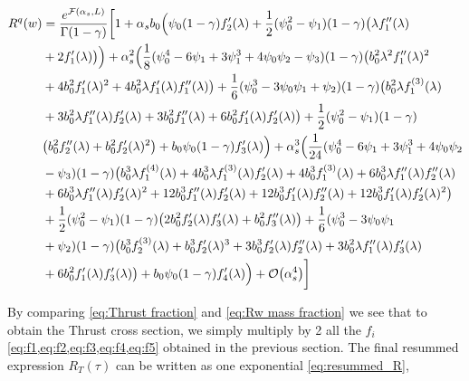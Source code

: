 \documentclass[../main.tex]{subfiles}
\begin{document}
\begin{align}
    \begin{split}\label{eq:Rw final expansion}
        R^q(w) &= \frac{e^{\mathcal{F}(\alpha_s,L)}}{\Gamma(1-\gamma)} \biggl[ 1 + \alpha_s b_0 \Bigl( \psi_0(1-\gamma) f_2'(\lambda )  + \frac{1}{2} (\psi_0^2-\psi_1)(1-\gamma)\bigl( \lambda  f_1''(\lambda ) \\
        &+2  f_1'(\lambda )\bigr)\Bigr) + \alpha_s^2 \Bigl(\frac{1}{8} (\psi_0^4 -6 \psi_1 + 3\psi_1^3 +4\psi_0\psi_2 -\psi_3)(1-\gamma) \bigl(b_0^2 \lambda ^2 f_1''(\lambda )^2\\
        &+4 b_0^2 f_1'(\lambda )^2 +4 b_0^2 \lambda  f_1'(\lambda ) f_1''(\lambda )\bigr)+\frac{1}{6} (\psi_0^3 -3 \psi_0\psi_1+\psi_2)(1-\gamma) \bigl(b_0^2 \lambda  f_1^{(3)}(\lambda )\\
        &+ 3 b_0^2 \lambda  f_1''(\lambda ) f_2'(\lambda )+3 b_0^2 f_1''(\lambda )+6 b_0^2 f_1'(\lambda ) f_2'(\lambda )\bigr)+\frac{1}{2} (\psi_0^2-\psi_1)(1-\gamma) \\
        &\bigl(b_0^2 f_2''(\lambda ) +b_0^2 f_2'(\lambda )^2\bigr) + b_0 \psi_0(1-\gamma) f_3'(\lambda )\Bigr) + \alpha_s^3 \Bigl(\frac{1}{24} (\psi_0^4 -6 \psi_1 + 3\psi_1^3 +4\psi_0\psi_2 \\
        &-\psi_3)(1-\gamma) \bigl(b_0^3 \lambda  f_1^{(4)}(\lambda ) +4 b_0^3 \lambda  f_1^{(3)}(\lambda ) f_2'(\lambda ) + 4 b_0^3 f_1^{(3)}(\lambda )+6 b_0^3 \lambda  f_1''(\lambda ) f_2''(\lambda ) \\
        &+ 6 b_0^3 \lambda  f_1''(\lambda ) f_2'(\lambda )^2 +12 b_0^3 f_1''(\lambda ) f_2'(\lambda )+12 b_0^3 f_1'(\lambda ) f_2''(\lambda ) + 12 b_0^3 f_1'(\lambda ) f_2'(\lambda )^2\bigr) \\
        &+ \frac{1}{2} (\psi_0^2-\psi_1)(1-\gamma) \bigl(2 b_0^2 f_2'(\lambda ) f_3'(\lambda )+b_0^2 f_3''(\lambda )\bigr) + \frac{1}{6} (\psi_0^3 -3 \psi_0\psi_1\\
        &+\psi_2)(1-\gamma) \bigl(b_0^3 f_2^{(3)}(\lambda )+b_0^3 f_2'(\lambda )^3 +3 b_0^3 f_2'(\lambda ) f_2''(\lambda )+3 b_0^2 \lambda  f_1''(\lambda ) f_3'(\lambda ) \\
        &+6 b_0^2 f_1'(\lambda ) f_3'(\lambda )\bigr) + b_0 \psi_0(1-\gamma) f_4'(\lambda ) \Bigr) + \order{\alpha_s^4} \biggr]
    \end{split}
\end{align}

By comparing \cref{eq:Thrust fraction} and \cref{eq:Rw mass fraction} we see that to obtain the Thrust cross section, we simply multiply by 2 all the $f_i$  \cref{eq:f1,eq:f2,eq:f3,eq:f4,eq:f5} 
obtained in the previous section. The final resummed expression $R_T(\tau)$ can be written as one exponential \cref{eq:resummed_R}, 
\end{document}
